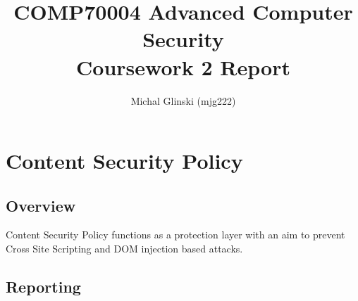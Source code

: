 \documentclass[11]{article}   %
\begin{document}
\title{COMP70004 Advanced Computer Security\\Coursework 2 Report} 
\author{Michal Glinski (mjg222)}    

\maketitle

\section{Content Security Policy}
\subsection{Overview}
Content Security Policy functions as a protection layer with an aim to prevent Cross Site Scripting and DOM injection based attacks. 

\subsection{Reporting}
\end{document}
